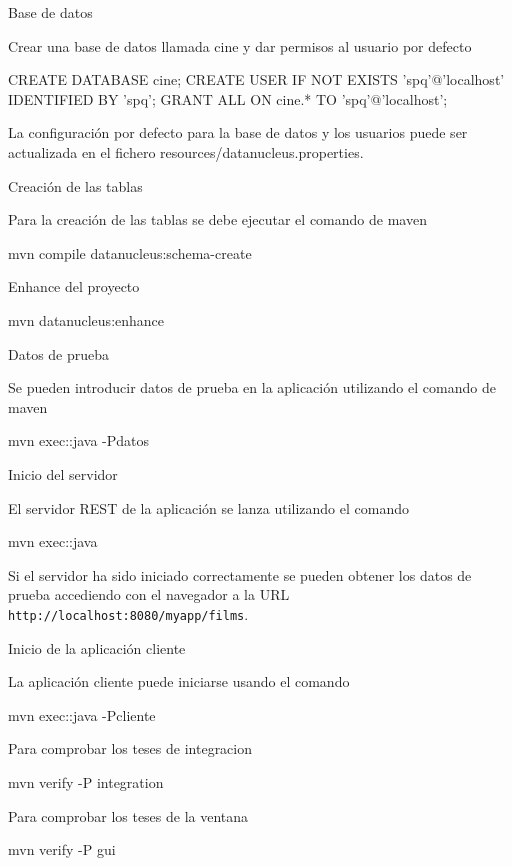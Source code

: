 Base de datos

Crear una base de datos llamada cine y dar permisos al usuario por defecto \begin{DoxyVerb}CREATE DATABASE cine;
CREATE USER IF NOT EXISTS 'spq'@'localhost' IDENTIFIED BY 'spq';
GRANT ALL ON cine.* TO 'spq'@'localhost';
\end{DoxyVerb}
 La configuración por defecto para la base de datos y los usuarios puede ser actualizada en el fichero resources/datanucleus.\+properties.

Creación de las tablas

Para la creación de las tablas se debe ejecutar el comando de maven \begin{DoxyVerb}mvn compile datanucleus:schema-create
\end{DoxyVerb}
 Enhance del proyecto \begin{DoxyVerb}mvn datanucleus:enhance
\end{DoxyVerb}
 Datos de prueba

Se pueden introducir datos de prueba en la aplicación utilizando el comando de maven \begin{DoxyVerb}mvn exec::java -Pdatos
\end{DoxyVerb}
 Inicio del servidor

El servidor REST de la aplicación se lanza utilizando el comando \begin{DoxyVerb}mvn exec::java
\end{DoxyVerb}
 Si el servidor ha sido iniciado correctamente se pueden obtener los datos de prueba accediendo con el navegador a la URL {\texttt{ http\+://localhost\+:8080/myapp/films}}.

Inicio de la aplicación cliente

La aplicación cliente puede iniciarse usando el comando \begin{DoxyVerb}mvn exec::java -Pcliente
\end{DoxyVerb}
 Para comprobar los teses de integracion \begin{DoxyVerb}mvn verify -P integration
\end{DoxyVerb}
 Para comprobar los teses de la ventana \begin{DoxyVerb}mvn verify -P gui
\end{DoxyVerb}
 